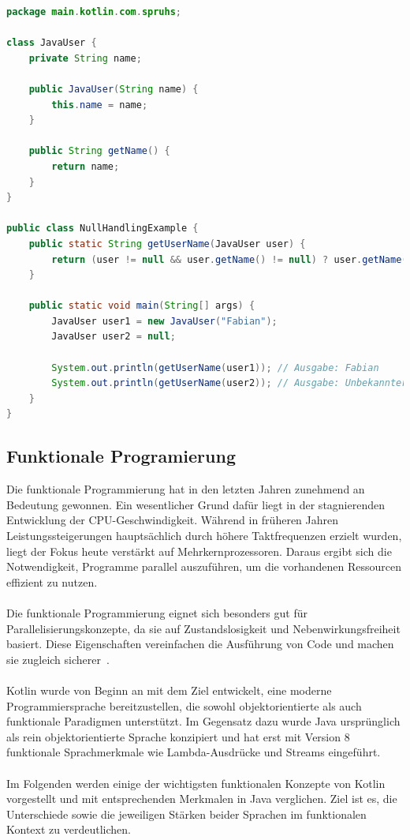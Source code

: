 \documentclass[11pt]{article}
\begin{document}
    \begin{lstlisting}[language=Java, caption={NullHandlingExample.java}, label={lst:java-user-null-safety}]
    package main.kotlin.com.spruhs;

class JavaUser {
    private String name;

    public JavaUser(String name) {
        this.name = name;
    }

    public String getName() {
        return name;
    }
}

public class NullHandlingExample {
    public static String getUserName(JavaUser user) {
        return (user != null && user.getName() != null) ? user.getName() : "Unbekannter Benutzer";
    }

    public static void main(String[] args) {
        JavaUser user1 = new JavaUser("Fabian");
        JavaUser user2 = null;

        System.out.println(getUserName(user1)); // Ausgabe: Fabian
        System.out.println(getUserName(user2)); // Ausgabe: Unbekannter Benutzer
    }
}
    \end{lstlisting}

    \subsection{Funktionale Programierung}

    Die funktionale Programmierung hat in den letzten Jahren zunehmend an Bedeutung gewonnen.
    Ein wesentlicher Grund dafür liegt in der stagnierenden Entwicklung der CPU-Geschwindigkeit.
    Während in früheren Jahren Leistungssteigerungen hauptsächlich durch höhere Taktfrequenzen erzielt wurden, liegt der Fokus heute verstärkt auf Mehrkernprozessoren.
    Daraus ergibt sich die Notwendigkeit, Programme parallel auszuführen, um die vorhandenen Ressourcen effizient zu nutzen.\\
    \\
    Die funktionale Programmierung eignet sich besonders gut für Parallelisierungskonzepte, da sie auf Zustandslosigkeit und Nebenwirkungsfreiheit basiert.
    Diese Eigenschaften vereinfachen die Ausführung von Code und machen sie zugleich sicherer~\cite[129]{kotlin-patterns}.\\
    \\
    Kotlin wurde von Beginn an mit dem Ziel entwickelt, eine moderne Programmiersprache bereitzustellen, die sowohl objektorientierte als auch funktionale Paradigmen unterstützt.
    Im Gegensatz dazu wurde Java ursprünglich als rein objektorientierte Sprache konzipiert und hat erst mit Version 8 funktionale Sprachmerkmale wie Lambda-Ausdrücke und Streams eingeführt.\\
    \\
    Im Folgenden werden einige der wichtigsten funktionalen Konzepte von Kotlin vorgestellt und mit entsprechenden Merkmalen in Java verglichen.
    Ziel ist es, die Unterschiede sowie die jeweiligen Stärken beider Sprachen im funktionalen Kontext zu verdeutlichen.
\end{document}
